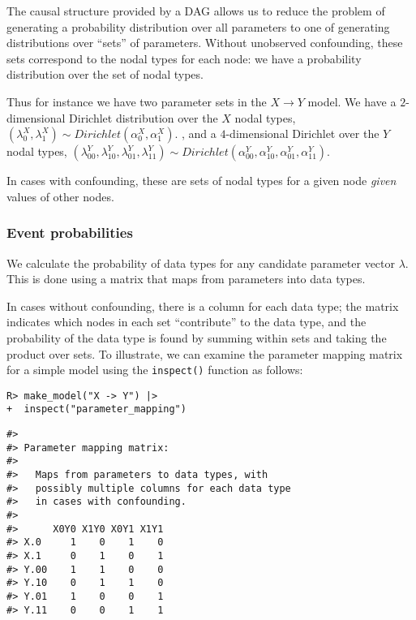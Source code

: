 \documentclass[
  11pt,
  article]{jss}
\begin{document}
The causal structure provided by a DAG allows us to reduce the problem
of generating a probability distribution over all parameters to one of
generating distributions over ``sets'' of parameters. Without unobserved
confounding, these sets correspond to the nodal types for each node: we
have a probability distribution over the set of nodal types.

Thus for instance we have two parameter sets in the \(X \rightarrow Y\)
model. We have a \(2\)-dimensional Dirichlet distribution over the \(X\)
nodal types,
\((\lambda^X_0, \lambda^X_1) \sim Dirichlet(\alpha^X_0, \alpha^X_1).\) ,
and a \(4\)-dimensional Dirichlet over the \(Y\) nodal types,
\((\lambda^Y_{00}, \lambda^Y_{10}, \lambda^Y_{01}, \lambda^Y_{11}) \sim Dirichlet(\alpha^Y_{00}, \alpha^Y_{10}, \alpha^Y_{01}, \alpha^Y_{11}).\)

In cases with confounding, these are sets of nodal types for a given
node \emph{given} values of other nodes.

\subsubsection{Event probabilities}\label{event-probabilities}

We calculate the probability of data types for any candidate parameter
vector \(\lambda\). This is done using a matrix that maps from
parameters into data types.

In cases without confounding, there is a column for each data type; the
matrix indicates which nodes in each set ``contribute'' to the data
type, and the probability of the data type is found by summing within
sets and taking the product over sets. To illustrate, we can examine the
parameter mapping matrix for a simple model using the \texttt{inspect()}
function as follows:

\begin{verbatim}
R> make_model("X -> Y") |> 
+  inspect("parameter_mapping") 
\end{verbatim}

\begin{verbatim}
#> 
#> Parameter mapping matrix: 
#> 
#>   Maps from parameters to data types, with
#>   possibly multiple columns for each data type
#>   in cases with confounding. 
#> 
#>      X0Y0 X1Y0 X0Y1 X1Y1
#> X.0     1    0    1    0
#> X.1     0    1    0    1
#> Y.00    1    1    0    0
#> Y.10    0    1    1    0
#> Y.01    1    0    0    1
#> Y.11    0    0    1    1
\end{verbatim}
\end{document}
